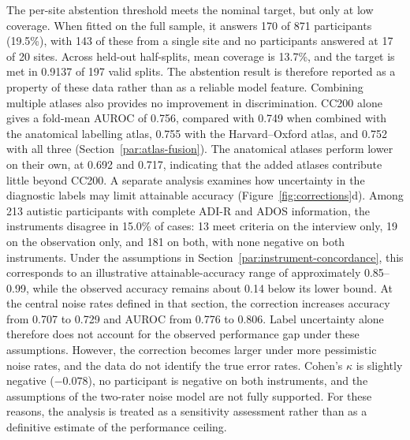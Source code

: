The per-site abstention threshold meets the nominal target, but only at low coverage. When fitted on the full sample, it answers 170 of 871 participants (19.5\%), with 143 of these from a single site and no participants answered at 17 of 20 sites. Across held-out half-splits, mean coverage is 13.7\%, and the target is met in 0.9137 of 197 valid splits. The abstention result is therefore reported as a property of these data rather than as a reliable model feature. Combining multiple atlases also provides no improvement in discrimination. CC200 alone gives a fold-mean AUROC of 0.756, compared with 0.749 when combined with the anatomical labelling atlas, 0.755 with the Harvard--Oxford atlas, and 0.752 with all three (Section~\ref{par:atlas-fusion}). The anatomical atlases perform lower on their own, at 0.692 and 0.717, indicating that the added atlases contribute little beyond CC200. A separate analysis examines how uncertainty in the diagnostic labels may limit attainable accuracy (Figure~\ref{fig:corrections}d). Among 213 autistic participants with complete ADI-R and ADOS information, the instruments disagree in 15.0\% of cases: 13 meet criteria on the interview only, 19 on the observation only, and 181 on both, with none negative on both instruments. Under the assumptions in Section~\ref{par:instrument-concordance}, this corresponds to an illustrative attainable-accuracy range of approximately 0.85--0.99, while the observed accuracy remains about 0.14 below its lower bound. At the central noise rates defined in that section, the correction \citep{Menonetal2015} increases accuracy from 0.707 to 0.729 and AUROC from 0.776 to 0.806. Label uncertainty alone therefore does not account for the observed performance gap under these assumptions. However, the correction becomes larger under more pessimistic noise rates, and the data do not identify the true error rates. Cohen's $\kappa$ is slightly negative ($-0.078$), no participant is negative on both instruments, and the assumptions of the two-rater noise model are not fully supported. For these reasons, the analysis is treated as a sensitivity assessment rather than as a definitive estimate of the performance ceiling.
